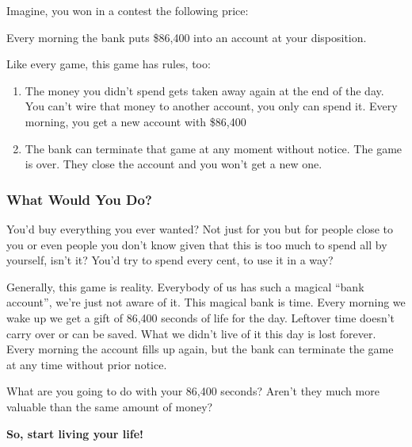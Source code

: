 \documentclass[../main.tex]{subfiles}
\begin{document}
Imagine, you won in a contest the following price:
\begin{center}
  Every morning the bank puts \$86,400 into an account at your disposition.
\end{center}

Like every game, this game has rules, too:

\begin{enumerate}
\item The money you didn't spend gets taken away again at the end of the day. You can't wire that money to another account, you only can spend it. Every morning, you get a new account with \$86,400
\item The bank can terminate that game at any moment without notice. The game is over. They close the account and you won't get a new one.
\end{enumerate}

\subsubsection{What Would You Do?}

You'd buy everything you ever wanted? Not just for you but for people close to you or even people you don't know given that this is too much to spend all by yourself, isn't it?
You'd try to spend every cent, to use it in a way?

Generally, this game is reality. Everybody of us has such a magical ``bank account'', we're just not aware of it. This magical bank is time. Every morning we wake up we get a gift of 86,400 seconds of life for the day. Leftover time doesn't carry over or can be saved. What we didn't live of it this day is lost forever.
Every morning the account fills up again, but the bank can terminate the game at any time without prior notice.

What are you going to do with your 86,400 seconds? Aren't they much more valuable than the same amount of money?

\begin{center}
  \textbf{So, start living your life!}
  \end{center}
\end{document}

